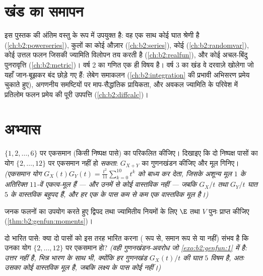 \section*{खंड का समापन}

 इस पुस्तक की अंतिम वस्तु के रूप में उपयुक्त है: वह एक साथ
कोई घात श्रेणी है (\cref{ch:b2:powerseries}),  कुलों का कोई औज़ार (\cref{ch:b2:series}), कोई
 (\cref{ch:b2:randomvar}), कोई उत्तल फलन जिसकी ज्यामिति विलोपन तय करती है
(\cref{ch:b2:realfun}), और कोई अचल-बिंदु पुनरावृत्ति (\cref{ch:b2:metric})। वर्ष 2 का गणित एक ही
विषय है। वर्ष 3 का खंड वे दरवाज़े खोलेगा जो यहाँ जान-बूझकर बंद छोड़े
गए हैं: लेबेग समाकलन (\cref{ch:b2:integration} की प्रभावी अभिसरण प्रमेय चुकाते हुए),
अगणनीय समष्टियों पर माप-सैद्धांतिक प्रायिकता, और अवकल ज्यामिति के
परिवेश में प्रतिलोम फलन प्रमेय की पूरी उपपत्ति (\cref{ch:b2:diffcalc})।

\section{अभ्यास}

\begin{exercise}[$\star$]\label{exo:b2:genfun:1}
$\{1, 2,
\dots, 6\}$ पर एकसमान  (किसी निष्पक्ष पासे) का  परिकलित कीजिए।
दिखाइए कि दो निष्पक्ष पासों का योग $\{2, \dots, 12\}$ पर एकसमान नहीं हो
\emph{सकता}: $G_{X+Y}$ का गुणनखंडन कीजिए और मूल गिनिए। \emph{(एकसमान योग
$G_X(t)G_Y(t) =
\frac{t^2}{11}\sum_{k=0}^{10}t^k$ को बाध्य कर देता, जिसके अशून्य मूल $1$ के अतिरिक्त $11$-वें
एकत्व-मूल हैं --- और उनमें से कोई वास्तविक नहीं --- जबकि $G_X/t$ तथा
$G_Y/t$ घात $5$ के वास्तविक बहुपद हैं, और हर एक के पास कम से कम एक
वास्तविक मूल है।)}
\end{exercise}

\begin{exercise}[$\star$]\label{exo:b2:genfun:2}
जनक फलनों का उपयोग करते हुए द्विपद तथा ज्यामितीय नियमों के लिए $\E$
तथा $V$ पुनः प्राप्त कीजिए (\cref{thm:b2:genfun:moments})।
\end{exercise}

\begin{exercise}[$\star$]\label{exo:b2:genfun:3}
दो भारित पासे: क्या दो पासों को इस तरह भारित करना ( रूप से,
समान रूप से या नहीं) संभव है कि उनका योग $\{2, \dots,
12\}$ पर एकसमान हो?
\emph{(वही गुणनखंडन-अवरोध जो \cref{exo:b2:genfun:1} में है: उत्तर नहीं है, भिन्न भारण
के साथ भी, क्योंकि हर गुणनखंड $G_X(t)/t$ की घात $5$ विषम है, अतः उसका कोई
वास्तविक मूल है, जबकि लक्ष्य के पास कोई नहीं।)}
\end{exercise}

